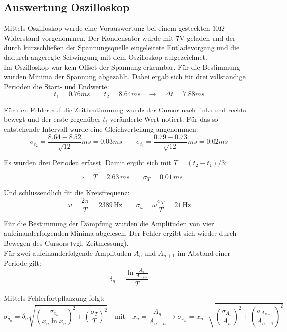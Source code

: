 \documentclass[12pt,a4paper]{article}
\begin{document}
\subsection{Auswertung Oszilloskop}
Mittels Oszilloskop wurde eine Vorauswertung bei einem gesteckten $10\Omega$ Widerstand vorgenommen. Der Kondensator wurde mit 7V geladen und der durch kurzschließen der Spannungsquelle eingeleitete Entladevorgang und die dadurch angeregte Schwingung mit dem Oszilloskop aufgezeichnet.\\
Im Oszilloskop war kein Offset der Spannung erkennbar. Für die Bestimmung wurden Minima der Spannung abgezählt. Dabei ergab sich für drei vollständige Perioden die Start- und Endwerte:
\begin{equation}
t_1=0.76ms \quad \quad t_2=8.64ms \quad \rightarrow \quad \Delta t=7.88ms
\end{equation}

Für den Fehler auf die Zeitbestimmung wurde der Cursor nach links und rechts bewegt und der erste gegenüber $t_i$ veränderte Wert notiert. Für das so entstehende Intervall wurde eine Gleichverteilung angenommen:
\begin{equation}
\sigma_{t_2}=\frac{8.64-8.52}{\sqrt{12}}ms=0.03ms \quad \quad 
\sigma_{t_1}=\frac{0.79-0.73}{\sqrt{12}}ms=0.02ms
\end{equation}

Es wurden drei Perioden erfasst. Damit ergibt sich mit $T=(t_2-t_1)/3$:

\begin{equation}
\Rightarrow \quad T=2.63\, ms \quad \quad \sigma_T=0.01\, ms
\end{equation}

Und schlussendlich für die Kreisfrequenz:
\begin{equation}
\omega=\frac{2\pi}{T}=2389 \, \text{Hz} \quad \quad \sigma_{\omega}=\omega \frac{\sigma_T}{T}=21 \, \text{Hz}
\end{equation}

Für die Bestimmung der Dämpfung wurden die Amplituden von vier aufeinanderfolgenden Minima abgelesen. Der Fehler ergibt sich wieder durch Bewegen des Cursors (vgl. Zeitmessung).\\
Für zwei aufeinanderfolgende Amplituden $A_n$ und $A_{n+1}$ im Abstand einer Periode gilt:
\begin{equation}
\delta_n=\frac{\ln{\frac{A_n}{A_{n+a}}}}{T}
\end{equation}

Mittels Fehlerfortpflanzung folgt:
\begin{equation}
\sigma_{\delta_n}=\delta_n \sqrt{(\frac{\sigma_{x_n}}{x_n \ln{x_n}})^2+(\frac{\sigma_T}{T})^2} \quad \text{mit} \quad x_n=\frac{A_n}{A_{n+a}} \rightarrow \sigma_{x_n}=x_n\cdot \sqrt{(\frac{\sigma_{A_n}}{A_n})^2+(\frac{\sigma_{A_{n+1}}}{A_{n+1}})^2}
\end{equation}
\end{document}
